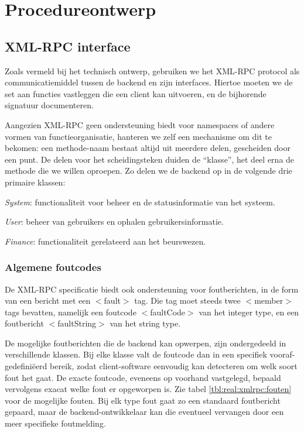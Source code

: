 %
%

\chapter{Procedureontwerp}

\section{XML-RPC interface}

Zoals vermeld bij het technisch ontwerp, gebruiken we het XML-RPC protocol als communicatiemiddel tussen de backend en zijn interfaces. Hiertoe moeten we de set aan functies vastleggen die een client kan uitvoeren, en de bijhorende signatuur documenteren.

Aangezien XML-RPC geen ondersteuning biedt voor namespaces of andere vormen van functieorganisatie, hanteren we zelf een mechanisme om dit te bekomen: een methode-naam bestaat altijd uit meerdere delen, gescheiden door een punt. De delen voor het scheidingsteken duiden de ``klasse'', het deel erna de methode die we willen oproepen.
Zo delen we de backend op in de volgende drie primaire klassen:
\begin{itemize_compact}
\item{\emph{System}: functionaliteit voor beheer en de statusinformatie van het systeem.}
\item{\emph{User}: beheer van gebruikers en ophalen gebruikersinformatie.}
\item{\emph{Finance}: functionaliteit gerelateerd aan het beurswezen.}
\end{itemize_compact}

\subsection{Algemene foutcodes}

De XML-RPC specificatie biedt ook ondersteuning voor foutberichten, in de form van een bericht met een $<$fault$>$ tag. Die tag moet steeds twee $<$member$>$ tags bevatten, namelijk een foutcode $<$faultCode$>$ van het integer type, en een foutbericht $<$faultString$>$ van het string type.

De mogelijke foutberichten die de backend kan opwerpen, zijn ondergedeeld in verschillende klassen. Bij elke klasse valt de foutcode dan in een specifiek vooraf-gedefini\"eerd bereik, zodat client-software eenvoudig kan detecteren om welk soort fout het gaat. De exacte foutcode, eveneens op voorhand vastgelegd, bepaald vervolgens exacat welke fout er opgeworpen is. Zie tabel \ref{tbl:real:xmlrpc:fouten} voor de mogelijke fouten.
Bij elk type fout gaat zo een standaard foutbericht gepaard, maar de backend-ontwikkelaar kan die eventueel vervangen door een meer specifieke foutmelding.

